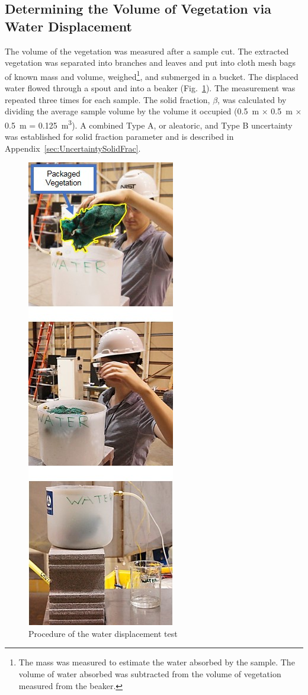 \documentclass[12pt]{article}
\begin{document}
\subsection{Determining the Volume of Vegetation via Water Displacement}
\label{ssec:waterdisp}

The volume of the vegetation was measured after a sample cut. The extracted vegetation was separated into branches and leaves and put into cloth mesh bags of known mass and volume, weighed\footnote{The mass was measured to estimate the water absorbed by the sample. The volume of water absorbed was subtracted from the volume of vegetation measured from the beaker.}, and submerged in a bucket. The displaced water flowed through a spout and into a beaker (Fig.~\ref{fig:wdt}). The measurement was repeated three times for each sample. The solid fraction, $\beta$, was calculated by dividing the average sample volume by the volume it occupied (0.5~\si{m} $\times$ 0.5~\si{m} $\times$ 0.5~\si{m} = 0.125~\si{m^{3}}). A combined Type A, or aleatoric, and Type B uncertainty was established for solid fraction parameter and is described in Appendix~\ref{sec:UncertaintySolidFrac}.

\begin{figure} [!]
	\centering 	\includegraphics[height=0.95\textheight,keepaspectratio]{Picture7.jpg}
	\caption{Procedure of the water displacement test}
	\label{fig:wdt}
\end{figure}
\end{document}
